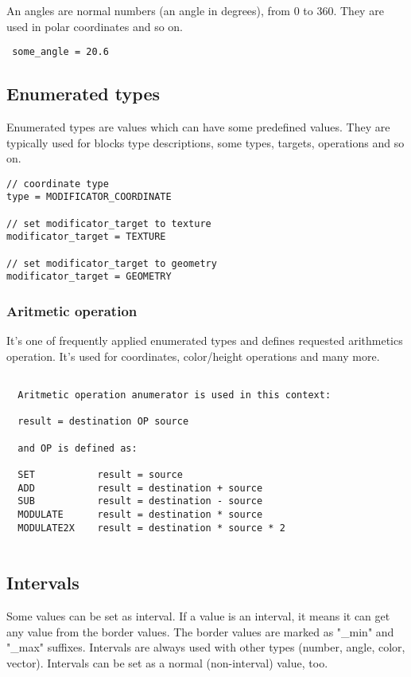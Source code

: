 \documentclass[11pt]{article}
\begin{document}
An angles are normal numbers (an angle in degrees), from 0 to 360. 
They are used in polar coordinates and so on.

\begin{verbatim}
 some_angle = 20.6
\end{verbatim}

\subsection{Enumerated types}

Enumerated types are values which can have some predefined values. 
They are typically used for blocks type descriptions, some types,
targets, operations and so on.

\begin{verbatim}
// coordinate type
type = MODIFICATOR_COORDINATE

// set modificator_target to texture
modificator_target = TEXTURE

// set modificator_target to geometry
modificator_target = GEOMETRY
\end{verbatim}

\subsubsection{Aritmetic operation}

It's one of frequently applied enumerated types and defines requested arithmetics
operation. It's used for coordinates, color/height operations and many more.

\begin{verbatim}  
  
  Aritmetic operation anumerator is used in this context:
  
  result = destination OP source
  
  and OP is defined as:

  SET           result = source
  ADD           result = destination + source
  SUB           result = destination - source
  MODULATE      result = destination * source
  MODULATE2X    result = destination * source * 2
    
\end{verbatim}

\subsection{Intervals}

Some values can be set as interval. If a value is an interval,
it means it can get any value from the border values. The border values
are marked as "\_min" and "\_max" suffixes. Intervals are always used
with other types (number, angle, color, vector). Intervals can be set 
as a normal (non-interval) value, too.
\end{document}
